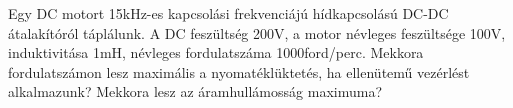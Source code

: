 \begin{example}

Egy DC motort 15kHz-es kapcsolási frekvenciájú hídkapcsolású DC-DC átalakítóról táplálunk. A DC feszültség 200V, a motor névleges feszültsége 100V, induktivitása 1mH, névleges fordulatszáma 1000ford/perc. Mekkora fordulatszámon lesz maximális a nyomatéklüktetés, ha ellenütemű vezérlést alkalmazunk? Mekkora lesz az áramhullámosság maximuma?

\tcbline
\vspace{1mm}

\solution

\end{example}